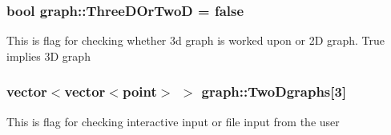 \subsubsection[{\texorpdfstring{Three\+D\+Or\+TwoD}{ThreeDOrTwoD}}]{\setlength{\rightskip}{0pt plus 5cm}bool graph\+::\+Three\+D\+Or\+TwoD = false}\hypertarget{namespacegraph_aaa8a7bf9ccfc70dd98f403db09e1d57f}{}\label{namespacegraph_aaa8a7bf9ccfc70dd98f403db09e1d57f}
This is flag for checking whether 3d graph is worked upon or 2D graph. True implies 3D graph 
\subsubsection[{\texorpdfstring{Two\+Dgraphs}{TwoDgraphs}}]{\setlength{\rightskip}{0pt plus 5cm}vector$<$vector$<${\bf point}$>$ $>$ graph\+::\+Two\+Dgraphs\mbox{[}3\mbox{]}}\hypertarget{namespacegraph_ac3d5fa2626975ad4c78b6eb5b1dac82f}{}\label{namespacegraph_ac3d5fa2626975ad4c78b6eb5b1dac82f}
This is flag for checking interactive input or file input from the user 